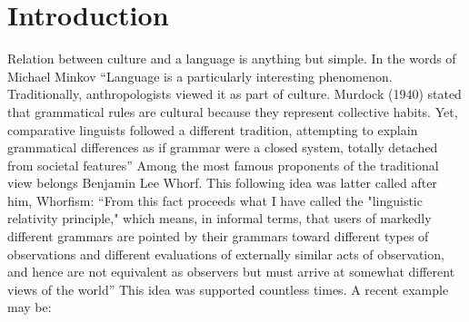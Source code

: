 \documentclass[a4paper,10pt]{article}
\begin{document}
\section{Introduction}
Relation between culture and a language is anything but simple.
In the words of Michael Minkov ``Language is a particularly interesting phenomenon.
Traditionally, anthropologists viewed it as part of culture.
Murdock (1940) stated that grammatical rules are cultural because they represent collective habits.
Yet, comparative linguists followed a different tradition,
attempting to explain grammatical differences as if grammar were a closed system,
totally detached from societal features''\cite{minkov2013}
Among the most famous proponents of the traditional view belongs Benjamin Lee Whorf.
This following idea was latter called after him, Whorfism:
``From this fact proceeds what I have called the "linguistic relativity principle,"
which means, in informal terms,
that users of markedly different grammars are pointed by their grammars toward different types of observations and different evaluations of externally similar acts of observation,
and hence are not equivalent as observers but must arrive at somewhat different views of the world''\cite{whorf1956} %
This idea was supported countless times. A recent example may be:
\end{document}
